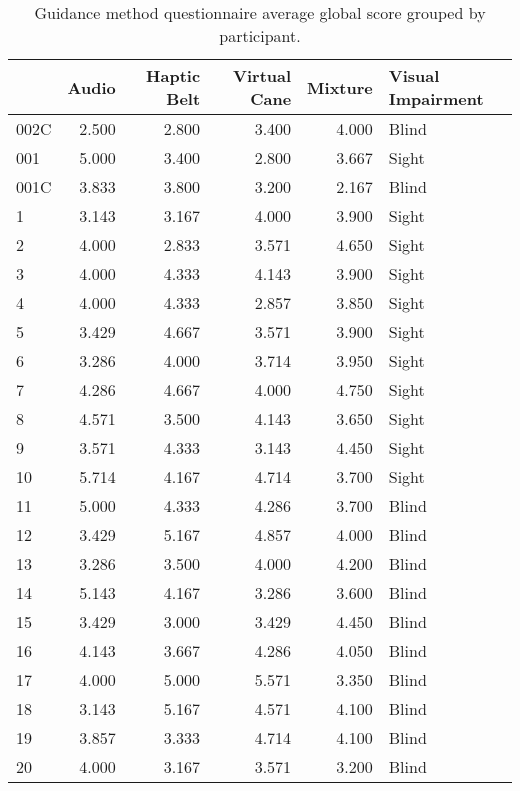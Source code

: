 
\begin{table}[!htb]
\centering
\caption{Guidance method questionnaire average global score grouped by participant.}
\label{tab:questionnaire_average}
\begin{tabular}{lrrrrl}
\toprule
{} &  Audio &  Haptic Belt &  Virtual Cane &  Mixture & Visual Impairment \\
\midrule
002C &  2.500 &        2.800 &         3.400 &    4.000 &             Blind \\
001  &  5.000 &        3.400 &         2.800 &    3.667 &             Sight \\
001C &  3.833 &        3.800 &         3.200 &    2.167 &             Blind \\
1    &  3.143 &        3.167 &         4.000 &    3.900 &             Sight \\
2    &  4.000 &        2.833 &         3.571 &    4.650 &             Sight \\
3    &  4.000 &        4.333 &         4.143 &    3.900 &             Sight \\
4    &  4.000 &        4.333 &         2.857 &    3.850 &             Sight \\
5    &  3.429 &        4.667 &         3.571 &    3.900 &             Sight \\
6    &  3.286 &        4.000 &         3.714 &    3.950 &             Sight \\
7    &  4.286 &        4.667 &         4.000 &    4.750 &             Sight \\
8    &  4.571 &        3.500 &         4.143 &    3.650 &             Sight \\
9    &  3.571 &        4.333 &         3.143 &    4.450 &             Sight \\
10   &  5.714 &        4.167 &         4.714 &    3.700 &             Sight \\
11   &  5.000 &        4.333 &         4.286 &    3.700 &             Blind \\
12   &  3.429 &        5.167 &         4.857 &    4.000 &             Blind \\
13   &  3.286 &        3.500 &         4.000 &    4.200 &             Blind \\
14   &  5.143 &        4.167 &         3.286 &    3.600 &             Blind \\
15   &  3.429 &        3.000 &         3.429 &    4.450 &             Blind \\
16   &  4.143 &        3.667 &         4.286 &    4.050 &             Blind \\
17   &  4.000 &        5.000 &         5.571 &    3.350 &             Blind \\
18   &  3.143 &        5.167 &         4.571 &    4.100 &             Blind \\
19   &  3.857 &        3.333 &         4.714 &    4.100 &             Blind \\
20   &  4.000 &        3.167 &         3.571 &    3.200 &             Blind \\
\bottomrule
\end{tabular}
\end{table}

